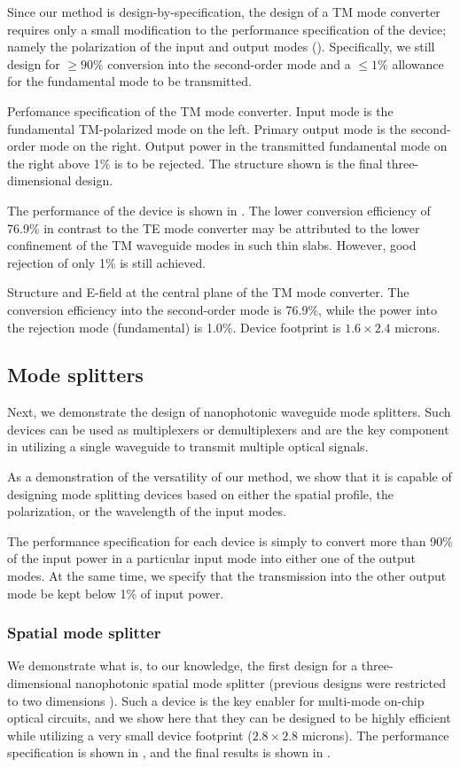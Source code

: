 Since our method is design-by-specification, 
    the design of a TM mode converter requires only
    a small modification to the performance specification of the device;
    namely the polarization of the input and output modes ().
Specifically, we still design for 
    $\ge 90\%$ conversion into the second-order mode and 
    a $\le 1\%$ allowance for the fundamental mode to be transmitted.

    {Perfomance specification of the TM mode converter.
    Input mode is the fundamental TM-polarized mode on the left.
    Primary output mode is the second-order mode on the right.
    Output power in the transmitted fundamental mode on the right 
    above 1\% is to be rejected.
    The structure shown is the final three-dimensional design.}
    
The performance of the device is shown in .
The lower conversion efficiency of 76.9\% in contrast to the TE mode converter
    may be attributed to the lower confinement of the TM waveguide modes 
    in such thin slabs.
However, good rejection of only 1\% is still achieved.

    {Structure and E-field at the central plane of the TM mode converter.
    The conversion efficiency into the second-order mode is 76.9\%,
    while the power into the rejection mode (fundamental) is 1.0\%.
    Device footprint is $1.6\times2.4$ microns.}

\subsection{Mode splitters}
Next, we demonstrate the design of nanophotonic waveguide mode splitters.
Such devices can be used as multiplexers or demultiplexers and
    are the key component in utilizing a single waveguide to transmit 
    multiple optical signals.

As a demonstration of the versatility of our method, 
    we show that it is capable of designing mode splitting devices 
    based on either the spatial profile, the polarization, or the wavelength
    of the input modes.

The performance specification for each device is simply to convert
    more than 90\% of the input power in a particular input mode into
    either one of the output modes.
At the same time, we specify that the transmission into the other output mode 
    be kept below 1\% of input power.

\subsubsection{Spatial mode splitter}
We demonstrate what is, to our knowledge, 
    the first design for a three-dimensional
    nanophotonic spatial mode splitter 
    (previous designs were restricted to two dimensions \cite{Jiao05}).
Such a device is the key enabler for multi-mode on-chip optical circuits,
    and we show here that they can be designed to be highly efficient
    while utilizing a very small device footprint ($2.8\times2.8$ microns). 
The performance specification is shown in ,
    and the final results is shown in .

